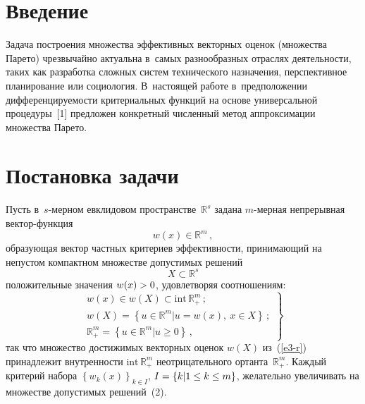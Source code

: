 \begin{multicols}{2}

\label{st\stat}

\section{Введение}

\vspace*{-3pt}

  Задача построения множества эффективных векторных оценок (множества 
Парето) чрезвычайно актуальна в~самых разнообразных отраслях 
деятельности, таких как разработка сложных сис\-тем технического 
назначения, перспективное планирование или социология. В~настоящей 
работе в~предположении дифференцируемости критериальных функций на 
основе универсальной процедуры~[1] предложен конкретный численный 
метод аппроксимации множества Парето.

\vspace*{-9pt}
  
\section{Постановка задачи}

\vspace*{-3pt}

  Пусть в~$s$-мерном евклидовом пространстве~$\mathbb{R}^s$ задана 
  $m$-мер\-ная непрерывная век\-тор-функ\-ция
  \begin{equation}
  w(x)\in \mathbb{R}^m\,,
  \label{e1-r}
  \end{equation}
образующая вектор частных критериев эффективности, принимающий на 
непустом компактном множестве допустимых решений 
\begin{equation}
X\subset \mathbb{R}^s
\label{e2-r}
\end{equation}
положительные значения $w(x)\hm>0$, удовлетворяя соотношениям:
\begin{equation}
\left.
\begin{array}{c}
w(x)\in w(X)\subset \mathrm{int}\, \mathbb{R}_+^m\,;\\[3pt]
w(X)=\left\{ u\in \mathbb{R}^m\vert u=w(x),\ x\in X\right\}\,;\\[3pt]
\mathbb{R}_+^m =\left\{ u\in \mathbb{R}^m\vert u\geq 0\right\}\,,
\end{array}
\right\}
\label{e3-r}
\end{equation}
так что множество достижимых векторных оценок $w(X)$ из~(\ref{e3-r}) 
принадлежит внутренности $\mathrm{int}\, \mathbb{R}_+^m$ не\-от\-ри\-ца\-тель\-но\-го 
ортанта~$\mathbb{R}_+^m$. Каждый критерий набора
$\left\{ w_k(x)\right\}_{k\in I}$, $I\hm=\left\{ k\vert 1\leq k\leq m\right\}$,
желательно увеличивать на множестве допустимых решений~(2).


\end{multicols}
